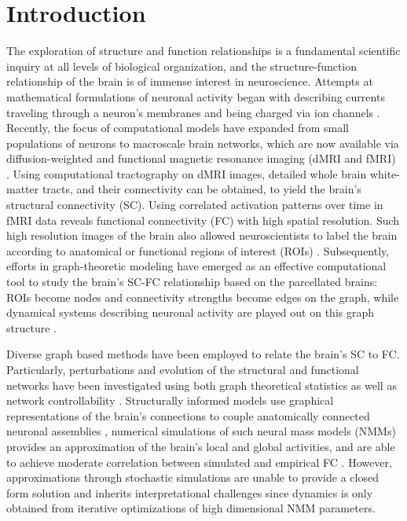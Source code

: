 \section{Introduction}
The exploration of structure and function relationships is a fundamental scientific inquiry at all levels of biological organization, and the structure-function relationship of the brain is of immense interest in neuroscience. Attempts at mathematical formulations of neuronal activity began with describing currents traveling through a neuron's membranes and being charged via ion channels \cite{hodgkin_quantitative_1952}. Recently, the focus of computational models have expanded from small populations of neurons to macroscale brain networks, which are now available via diffusion-weighted and functional magnetic resonance imaging (dMRI and fMRI) \cite{bullmore_complex_2009}. Using computational tractography on dMRI images, detailed whole brain white-matter tracts, and their connectivity can be obtained, to yield the brain's structural connectivity (SC). Using correlated activation patterns over time in fMRI data reveals functional connectivity (FC) with high spatial resolution. Such high resolution images of the brain also allowed neuroscientists to label the brain according to anatomical or functional regions of interest (ROIs) \cite{Desikan2006, craddock_whole_2012}. Subsequently, efforts in graph-theoretic modeling have emerged as an effective computational tool to study the brain's SC-FC relationship based on the parcellated brains: ROIs become nodes and connectivity strengths become edges on the graph, while dynamical systems describing neuronal activity are played out on this graph structure \cite{bassett_human_2009,bullmore_complex_2009,cao_topological_2014}.

Diverse graph based methods have been employed to relate the brain's SC to FC. Particularly, perturbations and evolution of the structural and functional networks have been investigated using both graph theoretical statistics \cite{chatterjee_understanding_2008, bassett_small-world_2006, he_structural_2008, buckner_molecular_2005, brunel_dynamics_2000, brunel_effects_2001, suarez_linking_2020} as well as network controllability \cite{gu_controllability_2015, muldoon_stimulation-based_2016}. Structurally informed models use graphical representations of the brain's connections to couple anatomically connected neuronal assemblies \cite{Wilson1972, el_boustani_master_2009}, numerical simulations of such neural mass models (NMMs) provides an approximation of the brain's local and global activities, and are able to achieve moderate correlation between simulated and empirical FC \cite{Nunez1974, jirsa_derivation_1997, Valdes1999, honey_predicting_2009, Spiegler2013}. However, approximations through stochastic simulations are unable to provide a closed form solution and inherits interpretational challenges since dynamics is only obtained from iterative optimizations of high dimensional NMM parameters. 

